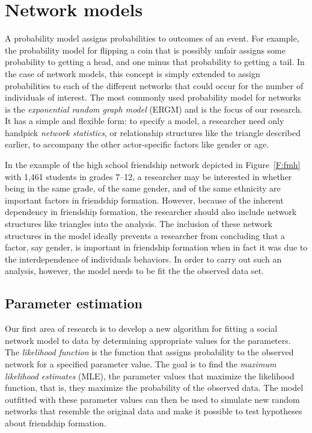 \documentclass[12pt]{article}
\begin{document}
\section{Network models}
A probability model assigns probabilities to outcomes of an event.  For example, 
the probability model for flipping a coin that is possibly unfair assigns some 
probability to getting a head, and one minus that probability to getting a tail.  
In the case of network models, this concept is simply 
extended to assign probabilities to each of the different networks that could 
occur for the number of individuals of interest.
The most commonly used probability model for networks is the 
\textit{exponential random graph model} (ERGM) 
\citep{Wasserman:1996,Pattison:1999,logit,Snijders:2002,introp*,ergm} and 
is the focus of our research.  It has a simple and flexible form:
to specify a model, a researcher need only handpick \textit{network statistics}, 
or relationship structures 
like the triangle described earlier, to accompany the other actor-specific 
factors like gender or age.  

In the example of the high school friendship network depicted in 
Figure~\ref{F:fmh} with 1,461 students in grades 7--12, a researcher may 
be interested in whether being in the same grade, of the same gender,
and of the same ethnicity are important factors in friendship formation.  
However, because of the inherent dependency in friendship formation, the 
researcher should also include network structures like triangles
into the analysis.  The inclusion of these network structures in the 
model ideally prevents a researcher from concluding
that a factor, say gender, is important in friendship formation when in 
fact it was due to the interdependence of individuals behaviors.  In order 
to carry out such an analysis, however, the model needs to be fit the 
the observed data set.

\subsection{Parameter estimation}
Our first area of research is to develop a new algorithm for fitting a 
social network model to data by determining appropriate values for the 
parameters.  The \emph{likelihood function} is the function that assigns 
probability to the observed network for a specified parameter value.
The goal is to find the \textit{maximum likelihood estimates} (MLE), the 
parameter values that maximize the likelihood function, that is, they 
maximize the probability of the observed data.
The model outfitted with these parameter values can then be used to simulate 
new random networks that resemble the original data and make it possible 
to test hypotheses about friendship formation.  
\end{document}
